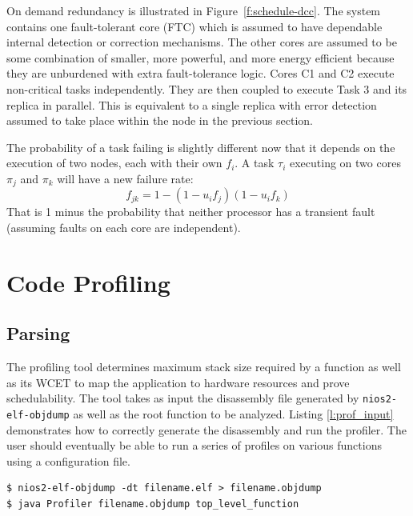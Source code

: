 \documentclass[table,11pt]{article}
\begin{document}
   On demand redundancy is illustrated in Figure~\ref{f:schedule-dcc}. The system contains one fault-tolerant core (FTC) which is assumed to have dependable internal detection or correction mechanisms. The other cores are assumed to be some combination of smaller, more powerful, and more energy efficient because they are unburdened with extra fault-tolerance logic. Cores C1 and C2 execute non-critical tasks independently. They are then coupled to execute Task 3 and its replica in parallel. This is equivalent to a single replica with error detection assumed to take place within the node in the previous section.
   
   The probability of a task failing is slightly different now that it depends on the execution of two nodes, each with their own $f_i$. A task $\tau_i$ executing on two cores $\pi_j$ and $\pi_k$ will have a new failure rate:
   \begin{equation}
   f_{jk} = 1 - (1-u_if_j)(1-u_if_k)
   \end{equation} 
That is 1 minus the probability that neither processor has a transient fault (assuming faults on each core are independent).
   
   


\section{Code Profiling}
\subsection{Parsing}
The profiling tool determines maximum stack size required by a function as well as its WCET to map the application to hardware resources and prove schedulability. The tool takes as input the disassembly file generated by \texttt{nios2-elf-objdump} as well as the root function to be analyzed. Listing \ref{l:prof_input} demonstrates how to correctly generate the disassembly and run the profiler. The user should eventually be able to run a series of profiles on various functions using a configuration file. 


\begin{lstlisting}[caption={Generating disassembly and running the profiler},label=l:prof_input]
$ nios2-elf-objdump -dt filename.elf > filename.objdump
$ java Profiler filename.objdump top_level_function
\end{lstlisting}
\end{document}
